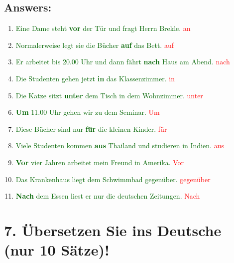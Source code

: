 \documentclass[12pt]{article}
\begin{document}
\subsection*{Answers:}
\begin{enumerate}
    \item \textcolor{darkgreen}{Eine Dame steht \textbf{vor} der Tür und fragt Herrn Brekle.} \textcolor{red}{an}
    \item \textcolor{darkgreen}{Normalerweise legt sie die Bücher \textbf{auf} das Bett.} \textcolor{red}{auf}
    \item \textcolor{darkgreen}{Er arbeitet bis 20.00 Uhr und dann fährt \textbf{nach} Haus am Abend.} \textcolor{red}{nach}
    \item \textcolor{darkgreen}{Die Studenten gehen jetzt \textbf{in} das Klassenzimmer.} \textcolor{red}{in}
    \item \textcolor{darkgreen}{Die Katze sitzt \textbf{unter} dem Tisch in dem Wohnzimmer.} \textcolor{red}{unter}
    \item \textcolor{darkgreen}{\textbf{Um} 11.00 Uhr gehen wir zu dem Seminar.} \textcolor{red}{Um}
    \item \textcolor{darkgreen}{Diese Bücher sind nur \textbf{für} die kleinen Kinder.} \textcolor{red}{für}
    \item \textcolor{darkgreen}{Viele Studenten kommen \textbf{aus} Thailand und studieren in Indien.} \textcolor{red}{aus}
    \item \textcolor{darkgreen}{\textbf{Vor} vier Jahren arbeitet mein Freund in Amerika.} \textcolor{red}{Vor}
    \item \textcolor{darkgreen}{Das Krankenhaus liegt dem Schwimmbad\textbf{} gegenüber.} \textcolor{red}{gegenüber}
    \item \textcolor{darkgreen}{\textbf{Nach} dem Essen liest er nur die deutschen Zeitungen.}  \textcolor{red}{Nach}
\end{enumerate}

\vspace{1em}

\section*{7. Übersetzen Sie ins Deutsche (nur 10 Sätze)!}
\end{document}
